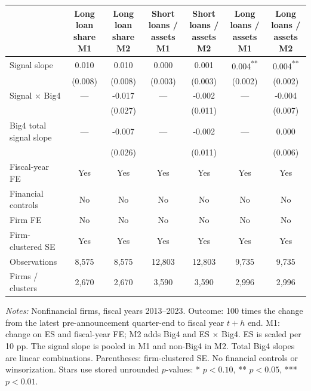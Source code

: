 \documentclass[10pt]{article}
\newcommand{\sym}[1]{\textsuperscript{#1}}
\begin{document}
\begin{minipage}{24cm}\fontsize{10.5}{13}\selectfont\centering
\setlength{\tabcolsep}{4pt}\renewcommand{\arraystretch}{1.12}
\begin{tabular*}{\textwidth}{@{\extracolsep{\fill}}lcccccc@{}}\toprule
 & \shortstack{Long loan share\\M1} & \shortstack{Long loan share\\M2} & \shortstack{Short loans / assets\\M1} & \shortstack{Short loans / assets\\M2} & \shortstack{Long loans / assets\\M1} & \shortstack{Long loans / assets\\M2} \\
\midrule
Signal slope & 0.010 & 0.010 & 0.000 & 0.001 & 0.004\sym{**} & 0.004\sym{**} \\
 & (0.008) & (0.008) & (0.003) & (0.003) & (0.002) & (0.002) \\
Signal $\times$ Big4 & --- & -0.017 & --- & -0.002 & --- & -0.004 \\
 &  & (0.027) &  & (0.011) &  & (0.007) \\
Big4 total signal slope & --- & -0.007 & --- & -0.002 & --- & 0.000 \\
 &  & (0.026) &  & (0.011) &  & (0.006) \\
\addlinespace
Fiscal-year FE & Yes & Yes & Yes & Yes & Yes & Yes \\
Financial controls & No & No & No & No & No & No \\
Firm FE & No & No & No & No & No & No \\
Firm-clustered SE & Yes & Yes & Yes & Yes & Yes & Yes \\
Observations & 8,575 & 8,575 & 12,803 & 12,803 & 9,735 & 9,735 \\
Firms / clusters & 2,670 & 2,670 & 3,590 & 3,590 & 2,996 & 2,996 \\
\bottomrule\end{tabular*}
\par\medskip\raggedright\fontsize{9}{11}\selectfont
\textit{Notes:} Nonfinancial firms, fiscal years 2013--2023. Outcome: 100 times the change from the latest pre-announcement quarter-end to fiscal year $t+h$ end. M1: change on ES and fiscal-year FE; M2 adds Big4 and ES $\times$ Big4. ES is scaled per 10 pp. The signal slope is pooled in M1 and non-Big4 in M2. Total Big4 slopes are linear combinations. Parentheses: firm-clustered SE. No financial controls or winsorization. Stars use stored unrounded $p$-values: * $p<0.10$, ** $p<0.05$, *** $p<0.01$.
\end{minipage}
\end{document}
